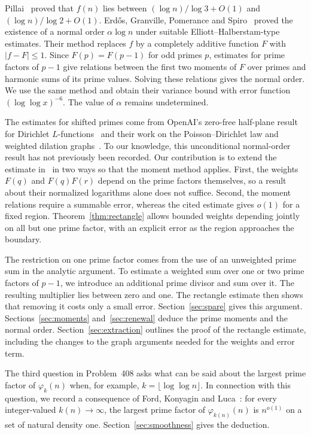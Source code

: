 \documentclass[10pt]{article}
\begin{document}
Pillai~\cite[p.~841]{Pillai} proved that $f(n)$ lies between $(\log n)/\log 3+O(1)$ and $(\log n)/\log 2+O(1)$. Erd\H{o}s, Granville, Pomerance and Spiro~\cite[Theorems~2.1--2.2]{EGPS} proved the existence of a normal order $\alpha\log n$ under suitable Elliott--Halberstam-type estimates. Their method replaces $f$ by a completely additive function $F$ with $|f-F|\leq1$. Since $F(p)=F(p-1)$ for odd primes $p$, estimates for prime factors of $p-1$ give relations between the first two moments of $F$ over primes and harmonic sums of its prime values. Solving these relations gives the normal order. We use the same method and obtain their variance bound with error function $(\log\log x)^{-6}$. The value of $\alpha$ remains undetermined.

The estimates for shifted primes come from OpenAI's zero-free half-plane result for Dirichlet $L$-functions~\cite[Theorem~1.1]{QRH} and their work on the Poisson--Dirichlet law and weighted dilation graphs~\cite{PD,WD}. To our knowledge, this unconditional normal-order result has not previously been recorded. Our contribution is to extend the estimate in~\cite[Theorem~7.1]{PD} in two ways so that the moment method applies. First, the weights $F(q)$ and $F(q)F(r)$ depend on the prime factors themselves, so a result about their normalized logarithms alone does not suffice. Second, the moment relations require a summable error, whereas the cited estimate gives $o(1)$ for a fixed region. Theorem~\ref{thm:rectangle} allows bounded weights depending jointly on all but one prime factor, with an explicit error as the region approaches the boundary.

The restriction on one prime factor comes from the use of an unweighted prime sum in the analytic argument. To estimate a weighted sum over one or two prime factors of $p-1$, we introduce an additional prime divisor and sum over it. The resulting multiplier lies between zero and one. The rectangle estimate then shows that removing it costs only a small error. Section~\ref{sec:spare} gives this argument. Sections~\ref{sec:moments} and~\ref{sec:renewal} deduce the prime moments and the normal order. Section~\ref{sec:extraction} outlines the proof of the rectangle estimate, including the changes to the graph arguments needed for the weights and error term.

The third question in Problem~408 asks what can be said about the largest prime factor of $\varphi_k(n)$ when, for example, $k=\lfloor\log\log n\rfloor$. In connection with this question, we record a consequence of Ford, Konyagin and Luca~\cite[Theorem~5]{FKL}: for every integer-valued $k(n)\to\infty$, the largest prime factor of $\varphi_{k(n)}(n)$ is $n^{o(1)}$ on a set of natural density one. Section~\ref{sec:smoothness} gives the deduction.
\end{document}
